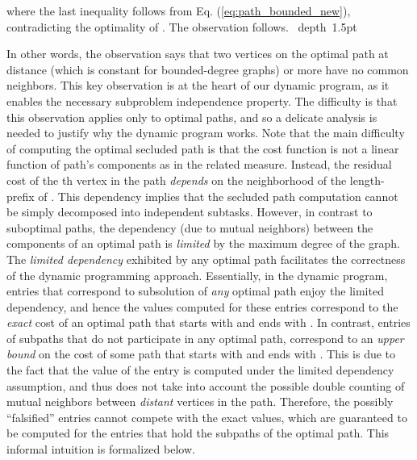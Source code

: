 \documentclass[12pt]{article}
\def\blackslug{\hbox{\hskip 1pt \vrule width 4pt height 8pt
    depth 1.5pt \hskip 1pt}}
\def\QED{\quad\blackslug\lower 8.5pt\null\par}
\begin{document}
where the last inequality follows from Eq. (\ref{eq:path_bounded_new}), contradicting the optimality of . The observation follows.
\QED
In other words, the observation says that two vertices on the optimal path at distance  (which is constant for bounded-degree graphs) or more have no common neighbors. This key observation is at the heart of our dynamic program, as it enables the necessary subproblem independence property. The difficulty is that this observation applies only to optimal paths, and so a delicate analysis is needed to justify why the dynamic program works.
Note that the main difficulty of computing the optimal secluded path  is that the cost function  is not a linear function of path's  components as in the related  measure. Instead, the residual cost of the th vertex in the path \emph{depends} on the neighborhood of the length- prefix of . This dependency implies that the secluded path computation cannot be simply decomposed into independent subtasks.
However, in contrast to suboptimal  paths, the dependency (due to mutual neighbors) between the components of an optimal path is \emph{limited} by the maximum degree  of the graph. The \emph{limited dependency} exhibited by any  optimal path facilitates the correctness of the dynamic programming approach. Essentially, in the dynamic program, entries that correspond to subsolution  of \emph{any} optimal  path enjoy the limited dependency, and hence the values computed for these entries correspond to the \emph{exact} cost of an optimal path that starts with  and ends with . In contrast, entries of subpaths  that do not participate in any optimal  path, correspond to an \emph{upper bound} on the cost of some path  that starts with  and ends with . This is due to the fact that the value of the entry is computed under the limited dependency assumption, and thus does not take into account the possible double counting of mutual neighbors between \emph{distant} vertices in the path. Therefore, the possibly ``falsified'' entries cannot compete with the exact values, which are guaranteed to be computed for the entries that hold the subpaths of the optimal path. This informal intuition is formalized below.
\end{document}
